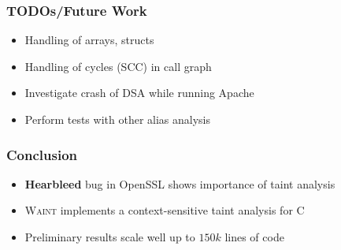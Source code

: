 \documentclass[xcolor=dvipsnames]{beamer}
\newcommand{\waint}{\textsc{Waint}\xspace}
\begin{document}
\begin{frame}
  \frametitle{TODOs/Future Work} 
    {\Large
   \begin{itemize}
   \item Handling of arrays, structs
	\vspace{0.5cm}   
   \item Handling of cycles (SCC) in call graph
	\vspace{0.5cm}      
   \item Investigate crash of DSA while running Apache   
	\vspace{0.5cm}      
   \item Perform tests with other alias analysis      
	\end{itemize}
	}
\end{frame}

\begin{frame}
  \frametitle{Conclusion} {
   \Large
	\begin{itemize}
	\item \textbf{Hearbleed} bug in OpenSSL shows importance of taint analysis
	\vspace{0.5cm}	
	\item \waint implements a context-sensitive taint analysis for C
	\vspace{0.5cm}
	\item Preliminary results scale well up to $150k$ lines of code
	\end{itemize}   
	}
\end{frame}
\end{document}

